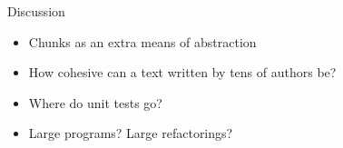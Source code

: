\documentclass{beamer}
\newcommand{\vfbtitle}[1]{\begin{center}\Huge{#1}\end{center}}
\begin{document}
\begin{frame}
  \vfbtitle{Discussion}

  \begin{itemize}
    \item Chunks as an extra means of abstraction
    \item How cohesive can a text written by tens of authors be?
    \item Where do unit tests go?
    \item Large programs?  Large refactorings?
  \end{itemize}
\end{frame}
\end{document}
